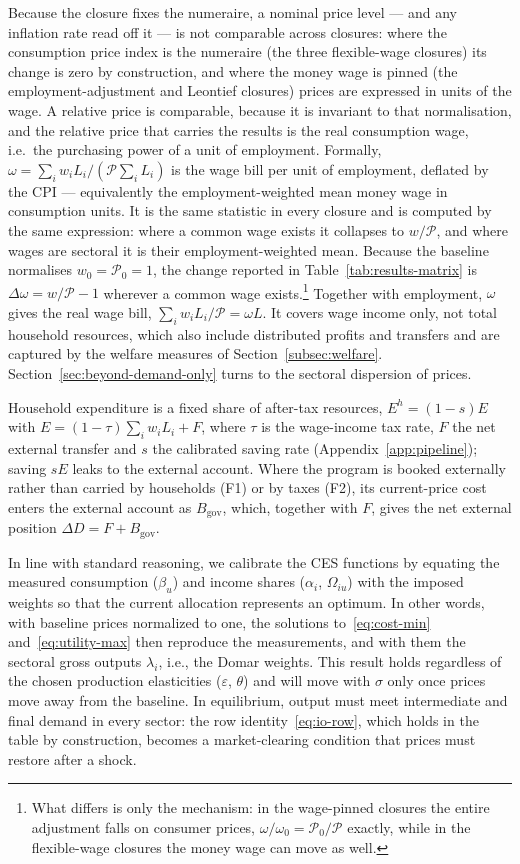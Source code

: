 Because the closure fixes the numeraire, a nominal price level --- and any inflation rate read off it --- is not comparable across closures: where the consumption price index is the numeraire (the three flexible-wage closures) its change is zero by construction, and where the money wage is pinned (the employment-adjustment and Leontief closures) prices are expressed in units of the wage. A relative price is comparable, because it is invariant to that normalisation, and the relative price that carries the results is the real consumption wage, i.e.\ the purchasing power of a unit of employment. Formally, $\omega = \sum_i w_i L_i/(\mathcal{P}\sum_i L_i)$ is the wage bill per unit of employment, deflated by the CPI --- equivalently the employment-weighted mean money wage in consumption units. It is the same statistic in every closure and is computed by the same expression: where a common wage exists it collapses to $w/\mathcal{P}$, and where wages are sectoral it is their employment-weighted mean. Because the baseline normalises $w_0=\mathcal{P}_0=1$, the change reported in Table~\ref{tab:results-matrix} is $\Delta\omega = w/\mathcal{P}-1$ wherever a common wage exists.\footnote{What differs is only the mechanism: in the wage-pinned closures the entire adjustment falls on consumer prices, $\omega/\omega_0 = \mathcal{P}_0/\mathcal{P}$ exactly, while in the flexible-wage closures the money wage can move as well.} Together with employment, $\omega$ gives the real wage bill, $\sum_i w_i L_i/\mathcal{P} = \omega L$. It covers wage income only, not total household resources, which also include distributed profits and transfers and are captured by the welfare measures of Section~\ref{subsec:welfare}. Section~\ref{sec:beyond-demand-only} turns to the sectoral dispersion of prices.

Household expenditure is a fixed share of after-tax resources, $E^h=(1-s)E$ with $E=(1-\tau)\sum_i w_i L_i+F$, where $\tau$ is the wage-income tax rate, $F$ the net external transfer and $s$ the calibrated saving rate (Appendix~\ref{app:pipeline}); saving $sE$ leaks to the external account.
Where the program is booked externally rather than carried by households (F1) or by taxes (F2), its current-price cost enters the external account as $B_{\mathrm{gov}}$, which, together with $F$, gives the net external position $\Delta D = F + B_{\mathrm{gov}}$.

In line with standard reasoning, we calibrate the CES functions by equating the measured consumption ($\beta_u$) and income shares ($\alpha_i$, $\Omega_{iu}$) with the imposed weights so that the current allocation represents an optimum. In other words, with baseline prices normalized to one, the solutions to~\eqref{eq:cost-min} and~\eqref{eq:utility-max} then reproduce the measurements, and with them the sectoral gross outputs $\lambda_i$, i.e., the Domar weights. This result holds regardless of the chosen production elasticities ($\varepsilon$, $\theta$) and will move with $\sigma$ only once prices move away from the baseline. In equilibrium, output must meet intermediate and final demand in every sector: the row identity~\eqref{eq:io-row}, which holds in the table by construction, becomes a market-clearing condition that prices must restore after a shock.

